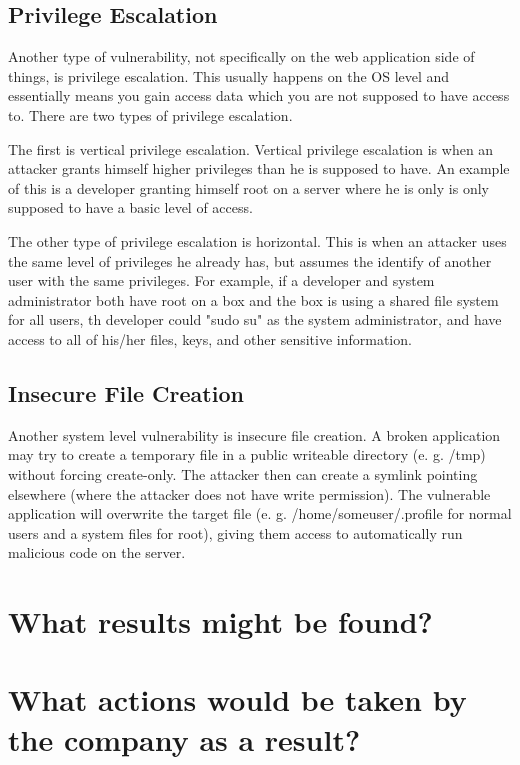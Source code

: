 \documentclass[12pt]{article}
\begin{document}
\subsection{Privilege Escalation}

Another type of vulnerability, not specifically on the web application side of
things, is privilege escalation. This usually happens on the OS level and 
essentially means you gain access data which you are not supposed to have
access to. There are two types of privilege escalation.

The first is vertical privilege escalation. Vertical privilege escalation 
is when an attacker grants himself higher privileges than he is supposed to
have. An example of this is a developer granting himself root on a server 
where he is only is only supposed to have a basic level of access.

The other type of privilege escalation is horizontal. This is when an attacker
uses the same level of privileges he already has, but assumes the identify of
another user with the same privileges. For example, if a developer and system
administrator both have root on a box and the box is using a shared file
system for all users, th developer could "sudo su" as the system administrator,
and have access to all of his/her files, keys, and other sensitive information.

\subsection{Insecure File Creation}

Another system level vulnerability is insecure file creation. A broken 
application may try to create a temporary file in a public writeable directory
(e. g. /tmp) without forcing create-only. The attacker then can create a 
symlink pointing elsewhere (where the attacker does not have write
permission). The vulnerable application will overwrite the target
file (e. g. /home/someuser/.profile for normal users and a system files for 
root), giving them access to automatically run malicious code on the server.

\section{What results might be found? }

\section{What actions would be taken by the company as a result?}
\end{document}
